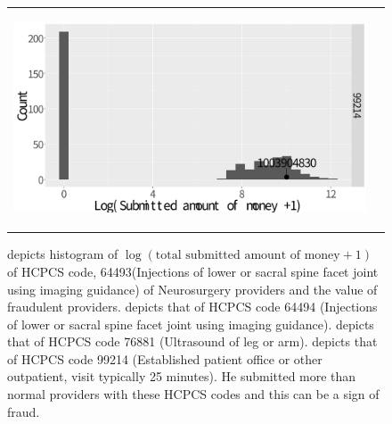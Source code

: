\documentclass[dvipdfmx, english]{ampmt}             %
\begin{document}
\begin{figure}[H]
\begin{tabular}{cc}
\begin{minipage}{.5\hsize}
	\subcaption{}\label{fig:Neuro3}
      \end{minipage} 
       \begin{minipage}{.5\hsize}
        \centering
        \centerline{\includegraphics[scale=0.22]{../img/fraud/Neurosurgery-99214.pdf}}
	\subcaption{}\label{fig:Neuro4}
      \end{minipage} \\
    \end{tabular} 
     \caption{ depicts histogram of $\log (\mbox{total submitted amount of money} +1)$ of HCPCS code, 64493(Injections of lower or sacral spine facet joint using imaging guidance) of Neurosurgery providers and the value of fraudulent providers. 
      depicts that of HCPCS code 64494 (Injections of lower or sacral spine facet joint using imaging guidance). 
      depicts that of HCPCS code 76881 (Ultrasound of leg or arm).
      depicts that of HCPCS code 99214 (Established patient office or other outpatient, visit typically 25 minutes). He submitted more than normal providers with these HCPCS codes and this can be a sign of fraud. }
      \label{fig:Neuro}
\end{figure}
\end{document}
